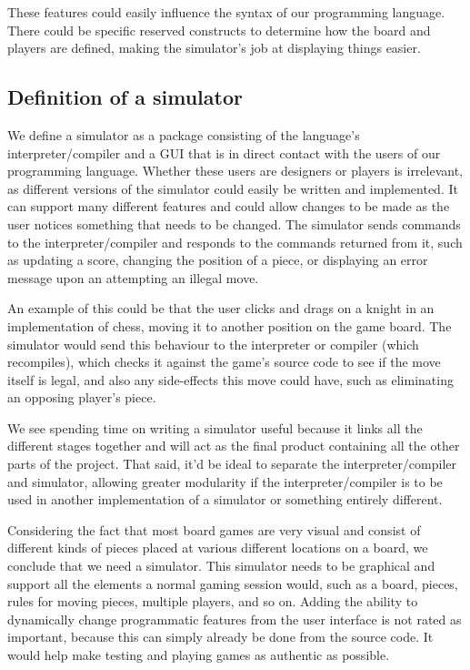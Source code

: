 These features could easily influence the syntax of our programming language.
There could be specific reserved constructs to determine how the board and
players are defined, making the simulator's job at displaying things easier.

\subsection{Definition of a simulator}
We define a simulator as a package consisting of the language's
interpreter/compiler and a GUI that is in direct contact with the users of our
programming language. Whether these users are designers or players is
irrelevant, as different versions of the simulator could easily be written and
implemented. It can support many different features and could allow changes to
be made as the user notices something that needs to be changed. The simulator
sends commands to the interpreter/compiler and responds to the commands returned
from it, such as updating a score, changing the position of a piece, or
displaying an error message upon an attempting an illegal move.

An example of this could be that the user clicks and drags on a knight in an
implementation of chess, moving it to another position on the game board. The
simulator would send this behaviour to the interpreter or compiler (which
recompiles), which checks it against the game's source code to see if the move
itself is legal, and also any side-effects this move could have, such as
eliminating an opposing player's piece.

We see spending time on writing a simulator useful because it links all the
different stages together and will act as the final product containing all the
other parts of the project. That said, it'd be ideal to separate the
interpreter/compiler and simulator, allowing greater modularity if the
interpreter/compiler is to be used in another implementation of a simulator or
something entirely different.

Considering the fact that most board games are very visual and consist of
different kinds of pieces placed at various different locations on a board, we
conclude that we need a simulator. This simulator needs to be graphical and
support all the elements a normal gaming session would, such as a board, pieces,
rules for moving pieces, multiple players, and so on. Adding the ability to
dynamically change programmatic features from the user interface is not rated as
important, because this can simply already be done from the source code. It
would help make testing and playing games as authentic as possible.
